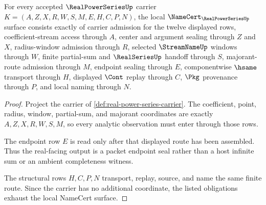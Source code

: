\begin{theorem}\label{thm:real-power-series-namecert-obligations}
For every accepted $\RealPowerSeriesUp$ carrier $K=(A,Z,X,R,W,S,M,E,H,C,P,N)$, the local $\NameCert_{\RealPowerSeriesUp}$ surface consists exactly of carrier admission for the twelve displayed rows, coefficient-stream access through $A$, center and argument sealing through $Z$ and $X$, radius-window admission through $R$, selected $\StreamNameUp$ windows through $W$, finite partial-sum and $\RealSeriesUp$ handoff through $S$, majorant-route admission through $M$, endpoint sealing through $E$, componentwise $\hsame$ transport through $H$, displayed $\Cont$ replay through $C$, $\Pkg$ provenance through $P$, and local naming through $N$.
\end{theorem}
\begin{proof}
Project the carrier of \autoref{def:real-power-series-carrier}. The coefficient, point, radius, window, partial-sum, and majorant coordinates are exactly $A,Z,X,R,W,S,M$, so every analytic observation must enter through those rows.

The endpoint row $E$ is read only after that displayed route has been assembled. Thus the real-facing output is a packet endpoint seal rather than a host infinite sum or an ambient completeness witness.

The structural rows $H,C,P,N$ transport, replay, source, and name the same finite route. Since the carrier has no additional coordinate, the listed obligations exhaust the local NameCert surface.
\end{proof}

